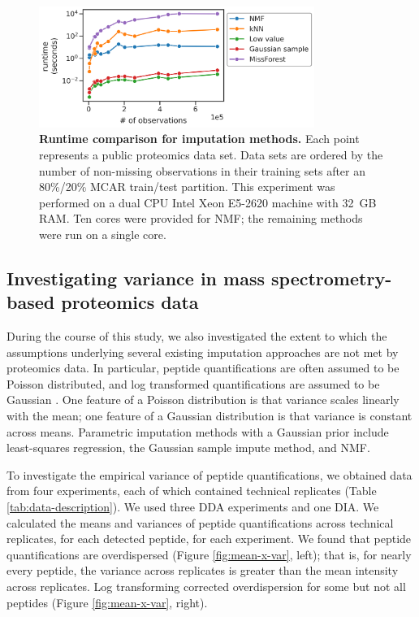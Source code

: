 \documentclass{article}
\begin{document}
\begin{figure}
  \centering
  \includegraphics[width=0.8\textwidth]{figures/runtimes-plotted-lineplot-cp1.png}
  \caption{{\bf Runtime comparison for imputation methods.} Each point represents a public proteomics data set. Data sets are ordered by the number of non-missing observations in their training sets after an 80\%/20\% MCAR train/test partition. This experiment was performed on a dual CPU Intel Xeon E5-2620 machine with 32~GB RAM. Ten cores were provided for NMF; the remaining methods were run on a single core.}
  \label{fig:runtime}
\end{figure} 

\subsection{Investigating variance in mass spectrometry-based proteomics data}

During the course of this study, we also investigated the extent to which the assumptions underlying several existing imputation approaches are not met by proteomics data. In particular, peptide quantifications are often assumed to be Poisson distributed, and log transformed quantifications are assumed to be Gaussian \cite{ms-dist-derivation, stat-theory-lcms, kimmel-2005}. One feature of a Poisson distribution is that variance scales linearly with the mean; one feature of a Gaussian distribution is that variance is constant across means. Parametric imputation methods with a Gaussian prior include least-squares regression, the Gaussian sample impute method, and NMF.

To investigate the empirical variance of peptide quantifications, we obtained data from four experiments, each of which contained technical replicates (Table \ref{tab:data-description}). We used three DDA experiments and one DIA. We calculated the means and variances of peptide quantifications across technical replicates, for each detected peptide, for each experiment. We found that peptide quantifications are overdispersed (Figure \ref{fig:mean-x-var}, left); that is, for nearly every peptide, the variance across replicates is greater than the mean intensity across replicates. Log transforming corrected overdispersion for some but not all peptides (Figure \ref{fig:mean-x-var}, right).
\end{document}
